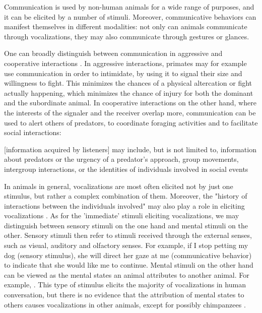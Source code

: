 Communication is used by non-human animals for a wide range of purposes, and it can be elicited by a number of stimuli. Moreover, communicative behaviors can manifest themselves in different modalities: not only can animals communicate through vocalizations, they may also communicate through gestures or glances.

One can broadly distinguish between communication in aggressive and cooperative interactions \citep{SeyfarthCheney03}. In aggressive interactions, primates may for example use communication in order to intimidate, by using it to signal their size and willingness to fight. This minimizes the chances of a physical altercation or fight actually happening, which minimizes the chance of injury for both the dominant and the subordinate animal.
In cooperative interactions on the other hand, where the interests of the signaler and the receiver overlap more, communication can be used to alert others of predators, to coordinate foraging activities and to facilitate social interactions:
\begin{quoting}
    {[information acquired by listeners]} may include, but is not limited to, information about predators or the urgency of a predator’s approach, group movements, intergroup interactions, or the identities of individuals involved in social events
    \hfill \citep[p.~168]{SeyfarthCheney03}
\end{quoting}

In animals in general, vocalizations are most often elicited not by just one stimulus, but rather a complex combination of them. Moreover, the "history of interactions between the individuals involved" may also play a role in eliciting vocalizations \citep[p.~151]{SeyfarthCheney03}. As for the 'immediate' stimuli eliciting vocalizations, we may distinguish between sensory stimuli on the one hand and mental stimuli on the other. Sensory stimuli then refer to stimuli received through the external senses, such as visual, auditory and olfactory senses.
For example, if I stop petting my dog (sensory stimulus), she will direct her gaze at me (communicative behavior) to indicate that she would like me to continue.
Mental stimuli on the other hand can be viewed as the mental states an animal attributes to another animal.
For example, .
This type of stimulus elicits the majority of vocalizations in human conversation, but there is no evidence that the attribution of mental states to others causes vocalizations in other animals, except for possibly chimpanzees \citep{SeyfarthCheney03}.

